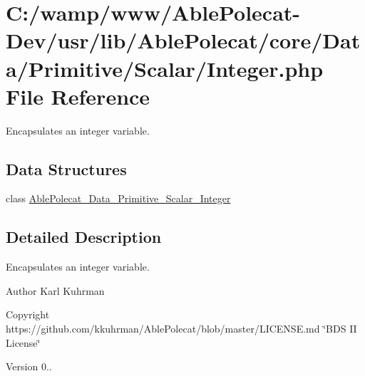 \hypertarget{_integer_8php}{}\section{C\+:/wamp/www/\+Able\+Polecat-\/\+Dev/usr/lib/\+Able\+Polecat/core/\+Data/\+Primitive/\+Scalar/\+Integer.php File Reference}
\label{_integer_8php}


Encapsulates an integer variable.  


\subsection*{Data Structures}
\begin{DoxyCompactItemize}
\item 
class \hyperlink{class_able_polecat___data___primitive___scalar___integer}{Able\+Polecat\+\_\+\+Data\+\_\+\+Primitive\+\_\+\+Scalar\+\_\+\+Integer}
\end{DoxyCompactItemize}


\subsection{Detailed Description}
Encapsulates an integer variable. 

\begin{DoxyAuthor}{Author}
Karl Kuhrman 
\end{DoxyAuthor}
\begin{DoxyCopyright}{Copyright}
https\+://github.com/kkuhrman/\+Able\+Polecat/blob/master/\+L\+I\+C\+E\+N\+S\+E.\+md \char`\"{}\+B\+D\+S I\+I License\char`\"{} 
\end{DoxyCopyright}
\begin{DoxyVersion}{Version}
0.. 
\end{DoxyVersion}
